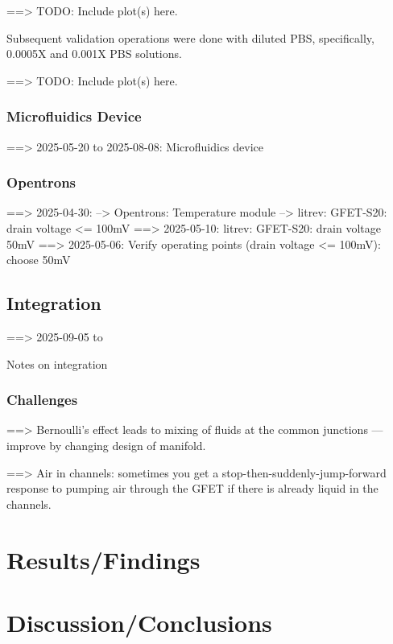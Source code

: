 \documentclass[]{article}
\begin{document}
==> TODO: Include plot(s) here.

Subsequent validation operations were done with diluted PBS, specifically, 0.0005X and 0.001X PBS solutions.

==> TODO: Include plot(s) here.

\subsubsection{Microfluidics Device}
==> 2025-05-20 to 2025-08-08: Microfluidics device

\subsubsection{Opentrons}
==> 2025-04-30:
--> Opentrons: Temperature module
--> litrev: GFET-S20: drain voltage <= 100mV
==> 2025-05-10: litrev: GFET-S20: drain voltage 50mV
==> 2025-05-06: Verify operating points (drain voltage <= 100mV): choose 50mV


\subsection{Integration}

==> 2025-09-05 to \date: Notes on integration

\subsubsection{Challenges}

==> Bernoulli's effect leads to mixing of fluids at the common junctions — improve by changing design of manifold.

==> Air in channels: sometimes you get a stop-then-suddenly-jump-forward response to pumping air through the GFET if there is already liquid in the channels.

\section{Results/Findings}



\section{Discussion/Conclusions}

\printbibheading
\printbibliography[type=article, title={Articles}, heading=subbibintoc]
\printbibliography[
  type=manual, title={Manuals and Technical Datasheets}, heading=subbibintoc]

\end{document}
